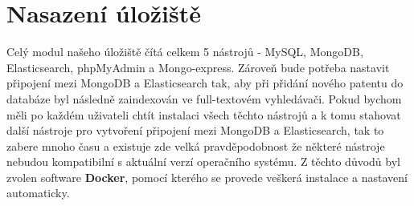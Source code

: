 \section{Nasazení úložiště}
Celý modul našeho úložiště čítá celkem 5 nástrojů - MySQL, MongoDB, Elasticsearch, phpMyAdmin a Mongo-express. Zároveň bude potřeba nastavit připojení mezi MongoDB a Elasticsearch tak, aby při přidání nového patentu do databáze byl následně zaindexován ve full-textovém vyhledávači. Pokud bychom měli po každém uživateli chtít instalaci všech těchto nástrojů a k tomu stahovat další nástroje pro vytvoření připojení mezi MongoDB a Elasticsearch, tak to zabere mnoho času a existuje zde velká pravděpodobnost že některé nástroje nebudou kompatibilní s aktuální verzí operačního systému. Z těchto důvodů byl zvolen software \textbf{Docker}, pomocí kterého se provede veškerá instalace a nastavení automaticky.

